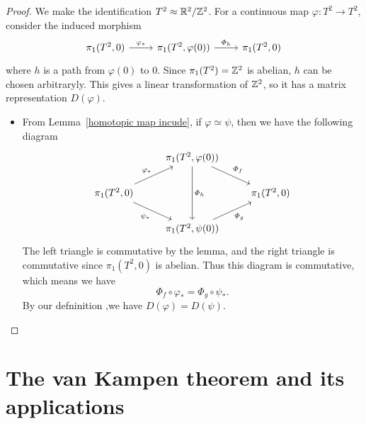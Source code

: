 \begin{proof}
We make the identification $T^2\approx\mathbb{R}^2/\mathbb{Z}^2$. For a continuous map $\varphi:T^2\to T^2$, consider the induced morphism 
\[\begin{tikzcd}
\pi_1(T^2,0)\ar[r,"\varphi_*"]&\pi_1(T^2,\varphi(0))\ar[r,"\varPhi_h"]&\pi_1(T^2,0)
\end{tikzcd}\]
where $h$ is a path from $\varphi(0)$ to $0$. Since $\pi_1(T^2)=\mathbb{Z}^2$ is abelian, $h$ can be chosen arbitraryly. This gives a linear transformation of $\mathbb{Z}^2$, so it has a matrix representation $D(\varphi)$.
\begin{itemize}
\item From Lemma~\ref{homotopic map incude}, if $\varphi\simeq\psi$, then we have the following diagram
\[\begin{tikzcd}
&\pi_1(T^2,\varphi(0))\ar[rd,"\varPhi_f"]\ar[dd,"\varPhi_h"]&\\
\pi_1(T^2,0)\ar[ru,"\varphi_*"]\ar[rd,swap,"\psi_*"]&&\pi_1(T^2,0)\\
&\pi_1(T^2,\psi(0))\ar[ru,swap,"\varPhi_g"]&
\end{tikzcd}\]
The left triangle is commutative by the lemma, and the right triangle is commutative since $\pi_1(T^2,0)$ is abelian. Thus this diagram is commutative, which means we have
\[\varPhi_f\circ\varphi_*=\varPhi_g\circ\psi_*.\]
By our defninition ,we have $D(\varphi)=D(\psi)$.\par
\end{itemize}
\end{proof}
\section{The van Kampen theorem and its applications}
